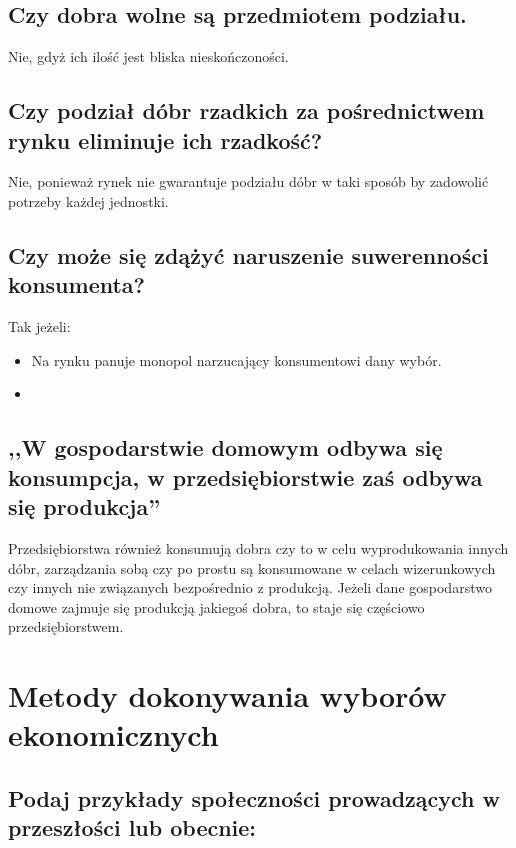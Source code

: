 \documentclass[a4paper,12pt]{article}
\begin{document}
\subsection{Czy dobra wolne są przedmiotem podziału.}

Nie, gdyż ich ilość jest bliska nieskończoności.

\subsection{Czy podział dóbr rzadkich za pośrednictwem rynku eliminuje ich rzadkość?}

Nie, ponieważ rynek nie gwarantuje podziału dóbr w taki sposób by zadowolić potrzeby każdej jednostki.

\subsection{Czy może się zdążyć naruszenie suwerenności konsumenta?}

Tak jeżeli:

\begin{itemize}
	\item Na rynku panuje monopol narzucający konsumentowi dany wybór.
	\item 
\end{itemize}

\subsection{,,W gospodarstwie domowym odbywa się konsumpcja, w przedsiębiorstwie zaś odbywa się produkcja''}

Przedsiębiorstwa również konsumują dobra czy to w celu wyprodukowania innych dóbr, zarządzania sobą czy po prostu są konsumowane w celach wizerunkowych czy innych nie związanych bezpośrednio z produkcją.
Jeżeli dane gospodarstwo domowe zajmuje się produkcją jakiegoś dobra, to staje się częściowo przedsiębiorstwem.

\section{Metody dokonywania wyborów ekonomicznych}

\subsection{Podaj przykłady społeczności prowadzących w przeszłości lub obecnie:}
\end{document}
